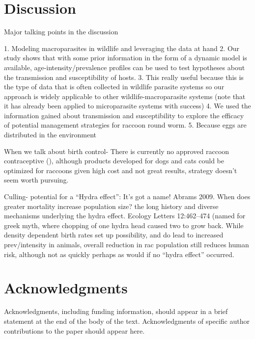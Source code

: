 \documentclass[11pt]{article}
\begin{document}
\section{Discussion}

Major talking points in the discussion

1. Modeling macroparasites in wildlife and leveraging the data at hand
2. Our study shows that with some prior information in the form of a dynamic model is available, age-intensity/prevalence profiles can be used to test hypotheses about the transmission and susceptibility of hosts.
3. This really useful because this is the type of data that is often collected in wildlife parasite systems so our approach is widely applicable to other wildlife-macroparasite systems (note that it has already been applied to microparasite systems with success)
4. We used the information gained about transmission and susceptibility to explore the efficacy of potential management strategies for raccoon round worm. 
5. Because eggs are distributed in the environment

When we talk about birth control- There is currently no approved raccoon
contraceptive (), although products developed for dogs and cats could be
optimized for raccoons given high cost and not great results, strategy
doesn't seem worth pursuing.

Culling- potential for a ``Hydra effect'': It's got a name! Abrams 2009.
When does greater mortality increase population size? the long history
and diverse mechanisms underlying the hydra effect. Ecology Letters
12:462--474 (named for greek myth, where chopping of one hydra head
caused two to grow back. While density dependent birth rates set up
possibility, and do lead to increased prev/intensity in animals, overall
reduction in rac population still reduces human risk, although not as
quickly perhaps as would if no ``hydra effect'' occurred.

\section{Acknowledgments} 

Acknowledgments, including funding
information, should appear in a brief statement at the end of the body
of the text. Acknowledgments of specific author contributions to the
paper should appear here.


\end{document}
